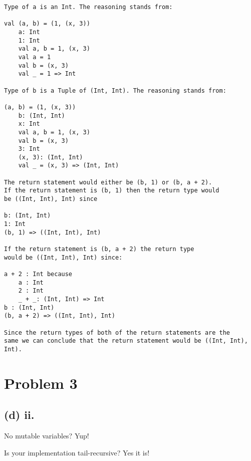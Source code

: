 \documentclass[11pt, oneside]{article}
\newcommand{\forceindent}{\leavevmode{\parindent=1.5em\indent}}
\begin{document}
\begin{verbatim}
Type of a is an Int. The reasoning stands from:

val (a, b) = (1, (x, 3))
    a: Int
    1: Int
    val a, b = 1, (x, 3)
    val a = 1
    val b = (x, 3)
    val _ = 1 => Int

Type of b is a Tuple of (Int, Int). The reasoning stands from:

(a, b) = (1, (x, 3))
    b: (Int, Int)
    x: Int
    val a, b = 1, (x, 3)
    val b = (x, 3)
    3: Int
    (x, 3): (Int, Int)
    val _ = (x, 3) => (Int, Int)

The return statement would either be (b, 1) or (b, a + 2). 
If the return statement is (b, 1) then the return type would 
be ((Int, Int), Int) since

b: (Int, Int)
1: Int
(b, 1) => ((Int, Int), Int)

If the return statement is (b, a + 2) the return type 
would be ((Int, Int), Int) since:

a + 2 : Int because
    a : Int
    2 : Int
    _ + _: (Int, Int) => Int
b : (Int, Int) 
(b, a + 2) => ((Int, Int), Int)

Since the return types of both of the return statements are the 
same we can conclude that the return statement would be ((Int, Int), Int).
\end{verbatim}

\section{Problem 3}

\subsection*{(d) ii.}
\forceindent No mutable variables? Yup!
\par Is your implementation tail-recursive? Yes it is!
\end{document}
